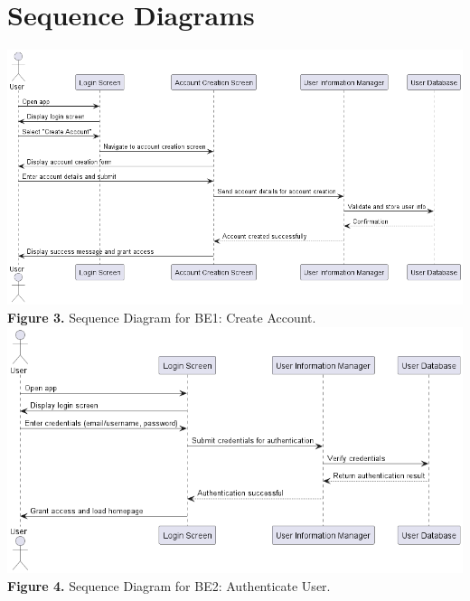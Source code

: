 \documentclass[]{article}
\begin{document}

\section{Sequence Diagrams}
\label{sec:sequence_diagrams}


\begin{center}
	\includegraphics[scale=0.5]{Sequence Diagrams/BE1_Sequence_Diagram.png}\\
	\textbf{Figure 3.} Sequence Diagram for BE1: Create Account.\\

	\includegraphics[scale=0.6]{Sequence Diagrams/BE2_Sequence_Diagram.png}\\
	\textbf{Figure 4.} Sequence Diagram for BE2: Authenticate User.\\


\end{center}
\end{document}
